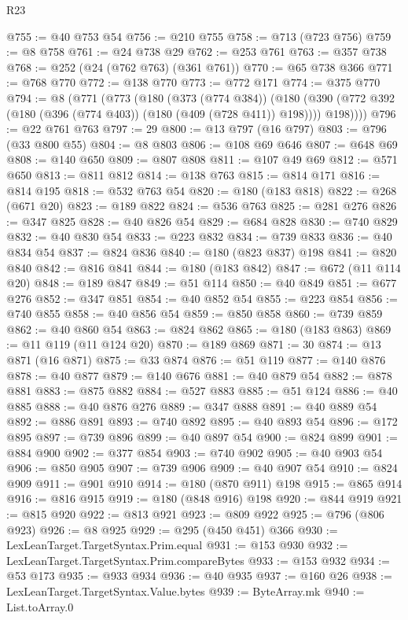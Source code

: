 \begin{lexlean}{R23}
\begin{coremodule}
{{{{{{{{{{{{{{{{{{{{{{{{{{{{{{{{{{{{{{{{{{{{{{{@755 := @40 @753 @54
@756 := @210 @755
@758 := @713 (@723 @756)
@759 := @8 @758
@761 := @24 @738 @29
@762 := @253 @761
@763 := @357 @738
@768 := @252 (@24 (@762 @763) (@361 @761))
@770 := @65 @738 @366
@771 := @768 @770
@772 := @138 @770
@773 := @772 @171
@774 := @375 @770
@794 := @8
    (@771
      (@773
        (@180
          (@373 (@774 @384))
          (@180 (@390 (@772 @392 (@180 (@396 (@774 @403)) (@180 (@409 (@728 @411)) @198)))) @198))))
@796 := @22 @761 @763
@797 := 29
@800 := @13 @797 (@16 @797)
@803 := @796 (@33 @800 @55)
@804 := @8 @803
@806 := @108 @69 @646
@807 := @648 @69
@808 := @140 @650
@809 := @807 @808
@811 := @107 @49 @69
@812 := @571 @650
@813 := @811 @812
@814 := @138 @763
@815 := @814 @171
@816 := @814 @195
@818 := @532 @763 @54
@820 := @180 (@183 @818)
@822 := @268 (@671 @20)
@823 := @189 @822
@824 := @536 @763
@825 := @281 @276
@826 := @347 @825
@828 := @40 @826 @54
@829 := @684 @828
@830 := @740 @829
@832 := @40 @830 @54
@833 := @223 @832
@834 := @739 @833
@836 := @40 @834 @54
@837 := @824 @836
@840 := @180 (@823 @837) @198
@841 := @820 @840
@842 := @816 @841
@844 := @180 (@183 @842)
@847 := @672 (@11 @114 @20)
@848 := @189 @847
@849 := @51 @114
@850 := @40 @849
@851 := @677 @276
@852 := @347 @851
@854 := @40 @852 @54
@855 := @223 @854
@856 := @740 @855
@858 := @40 @856 @54
@859 := @850 @858
@860 := @739 @859
@862 := @40 @860 @54
@863 := @824 @862
@865 := @180 (@183 @863)
@869 := @11 @119 (@11 @124 @20)
@870 := @189 @869
@871 := 30
@874 := @13 @871 (@16 @871)
@875 := @33 @874
@876 := @51 @119
@877 := @140 @876
@878 := @40 @877
@879 := @140 @676
@881 := @40 @879 @54
@882 := @878 @881
@883 := @875 @882
@884 := @527 @883
@885 := @51 @124
@886 := @40 @885
@888 := @40 @876 @276
@889 := @347 @888
@891 := @40 @889 @54
@892 := @886 @891
@893 := @740 @892
@895 := @40 @893 @54
@896 := @172 @895
@897 := @739 @896
@899 := @40 @897 @54
@900 := @824 @899
@901 := @884 @900
@902 := @377 @854
@903 := @740 @902
@905 := @40 @903 @54
@906 := @850 @905
@907 := @739 @906
@909 := @40 @907 @54
@910 := @824 @909
@911 := @901 @910
@914 := @180 (@870 @911) @198
@915 := @865 @914
@916 := @816 @915
@919 := @180 (@848 @916) @198
@920 := @844 @919
@921 := @815 @920
@922 := @813 @921
@923 := @809 @922
@925 := @796 (@806 @923)
@926 := @8 @925
@929 := @295 (@450 @451) @366
@930 := LexLeanTarget.TargetSyntax.Prim.equal
@931 := @153 @930
@932 := LexLeanTarget.TargetSyntax.Prim.compareBytes
@933 := @153 @932
@934 := @53 @173
@935 := @933 @934
@936 := @40 @935
@937 := @160 @26
@938 := LexLeanTarget.TargetSyntax.Value.bytes
@939 := ByteArray.mk
@940 := List.toArray.{0}
}}}}}}}}}}}}}}}}}}}}}}}}}}}}}}}}}}}}}}}}}}}}}}}
\end{coremodule}
\end{lexlean}
